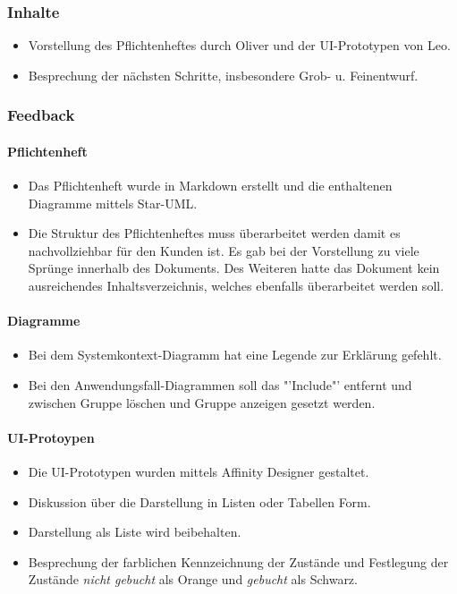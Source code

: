 \subsubsection{Inhalte}
\begin{itemize}
\item Vorstellung des Pflichtenheftes durch Oliver und der UI-Prototypen von Leo.
\item Besprechung der nächsten Schritte, insbesondere Grob- u. Feinentwurf.
\end{itemize}

\subsubsection{Feedback}

\paragraph{Pflichtenheft}
\begin{itemize}
\item Das Pflichtenheft wurde in Markdown erstellt und die enthaltenen
Diagramme mittels Star-UML.
\item Die Struktur des Pflichtenheftes muss überarbeitet werden damit es nachvollziehbar für den Kunden ist. Es gab bei der Vorstellung zu viele Sprünge innerhalb des Dokuments. Des Weiteren hatte das Dokument kein ausreichendes Inhaltsverzeichnis, welches ebenfalls überarbeitet werden soll.
\end{itemize}

\paragraph{Diagramme}
\begin{itemize}
\item Bei dem Systemkontext-Diagramm hat eine Legende zur Erklärung gefehlt.
\item Bei den Anwendungsfall-Diagrammen soll das "'Include"' entfernt und zwischen Gruppe löschen und Gruppe anzeigen gesetzt werden.
\end{itemize}

\paragraph{UI-Protoypen}
\begin{itemize}
\item Die UI-Prototypen wurden mittels Affinity Designer gestaltet.
\item Diskussion über die Darstellung in Listen oder Tabellen Form.
\item Darstellung als Liste wird beibehalten.
\item Besprechung der farblichen Kennzeichnung der Zustände und Festlegung der Zustände \textit{nicht gebucht} als Orange und \textit{gebucht} als Schwarz.
\end{itemize}

